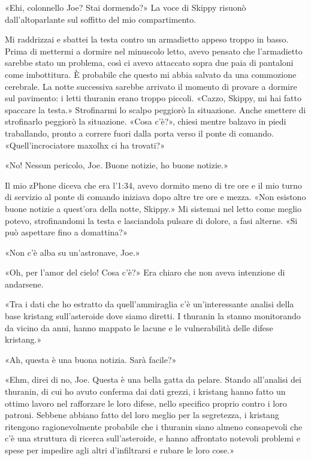 \hfill\break

«Ehi, colonnello Joe? Stai dormendo?» La voce di Skippy risuonò
dall'altoparlante sul soffitto del mio compartimento.

Mi raddrizzai e sbattei la testa contro un armadietto appeso troppo in
basso. Prima di mettermi a dormire nel minuscolo letto, avevo pensato
che l'armadietto sarebbe stato un problema, così ci avevo attaccato
sopra due paia di pantaloni come imbottitura. È probabile che questo mi
abbia salvato da una commozione cerebrale. La notte successiva sarebbe
arrivato il momento di provare a dormire sul pavimento: i letti thuranin
erano troppo piccoli. «Cazzo, Skippy, mi hai fatto spaccare la testa.»
Strofinarmi lo scalpo peggiorò la situazione. Anche smettere di
strofinarlo peggiorò la situazione. «Cosa c'è?», chiesi mentre balzavo
in piedi traballando, pronto a correre fuori dalla porta verso il ponte
di comando. «Quell'incrociatore maxolhx ci ha trovati?»

«No! Nessun pericolo, Joe. Buone notizie, ho buone notizie.»

Il mio zPhone diceva che era l'1:34, avevo dormito meno di tre ore e il
mio turno di servizio al ponte di comando iniziava dopo altre tre ore e
mezza. «Non esistono buone notizie a quest'ora della notte, Skippy.» Mi
sistemai nel letto come meglio potevo, strofinandomi la testa e
lasciandola pulsare di dolore, a fasi alterne. «Si può aspettare fino a
domattina?»

«Non c'è alba su un'astronave, Joe.»

«Oh, per l'amor del cielo! Cosa c'è?» Era chiaro che non aveva
intenzione di andarsene.

«Tra i dati che ho estratto da quell'ammiraglia c'è un'interessante
analisi della base kristang sull'asteroide dove siamo diretti. I
thuranin la stanno monitorando da vicino da anni, hanno mappato le
lacune e le vulnerabilità delle difese kristang.»

«Ah, questa è una buona notizia. Sarà facile?»

«Ehm, direi di no, Joe. Questa è una bella gatta da pelare. Stando
all'analisi dei thuranin, di cui ho avuto conferma dai dati grezzi, i
kristang hanno fatto un ottimo lavoro nel rafforzare le loro difese,
nello specifico proprio contro i loro patroni. Sebbene abbiano fatto del
loro meglio per la segretezza, i kristang ritengono ragionevolmente
probabile che i thuranin siano almeno consapevoli che c'è una struttura
di ricerca sull'asteroide, e hanno affrontato notevoli problemi e spese
per impedire agli altri d'infiltrarsi e rubare le loro cose.»

